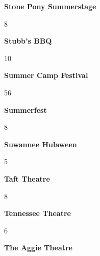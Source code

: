 \newline 
\begin{center}\textbf{Stone Pony Summerstage}\end{center}
\begin{center}8\end{center} 
\newline 
\begin{center}\textbf{Stubb's BBQ}\end{center}
\begin{center}10\end{center} 
\newline 
\begin{center}\textbf{Summer Camp Festival}\end{center}
\begin{center}56\end{center} 
\newline 
\begin{center}\textbf{Summerfest}\end{center}
\begin{center}8\end{center} 
\newline 
\begin{center}\textbf{Suwannee Hulaween}\end{center}
\begin{center}5\end{center} 
\newline 
\begin{center}\textbf{Taft Theatre}\end{center}
\begin{center}8\end{center} 
\newline 
\begin{center}\textbf{Tennessee Theatre}\end{center}
\begin{center}6\end{center} 
\newline 
\begin{center}\textbf{The Aggie Theatre}\end{center}
